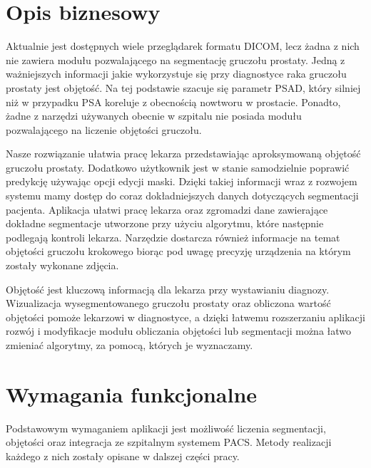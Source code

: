 \documentclass[a4paper,11pt,twoside]{report}
\theoremstyle{definition}
\begin{document}
\section{Opis biznesowy}

Aktualnie jest dostępnych wiele przeglądarek formatu DICOM, lecz żadna z nich nie zawiera modułu pozwalającego na segmentację gruczołu prostaty. Jedną z ważniejszych informacji jakie wykorzystuje się przy diagnostyce raka gruczołu prostaty jest objętość. Na tej podstawie szacuje się parametr PSAD, który silniej niż w przypadku PSA koreluje z obecnością nowtworu w prostacie. Ponadto, żadne z narzędzi używanych obecnie w szpitalu nie posiada modułu pozwalającego na liczenie objętości gruczołu.
\par
Nasze rozwiązanie ułatwia pracę lekarza przedstawiając aproksymowaną objętość gruczołu prostaty. Dodatkowo użytkownik jest w stanie samodzielnie poprawić predykcję używając opcji edycji maski. Dzięki takiej informacji wraz z rozwojem systemu mamy dostęp do coraz dokładniejszych danych dotyczących segmentacji pacjenta. Aplikacja ułatwi pracę lekarza oraz zgromadzi dane zawierające dokładne segmentacje utworzone przy użyciu algorytmu, które następnie podlegają kontroli lekarza. Narzędzie dostarcza również informacje na temat objętości gruczołu krokowego biorąc pod uwagę precyzję urządzenia na którym zostały wykonane zdjęcia. 
\par
Objętość jest kluczową informacją dla lekarza przy wystawianiu diagnozy. Wizualizacja wysegmentowanego gruczołu prostaty oraz obliczona wartość objętości pomoże lekarzowi w diagnostyce, a dzięki łatwemu rozszerzaniu aplikacji rozwój i modyfikacje modułu obliczania objętości lub segmentacji można łatwo zmieniać algorytmy, za pomocą, których je wyznaczamy.

\section{Wymagania funkcjonalne}

Podstawowym wymaganiem aplikacji jest możliwość liczenia segmentacji, objętości oraz integracja ze szpitalnym systemem PACS. Metody realizacji każdego z nich zostały opisane w dalszej części pracy. 
\end{document}
